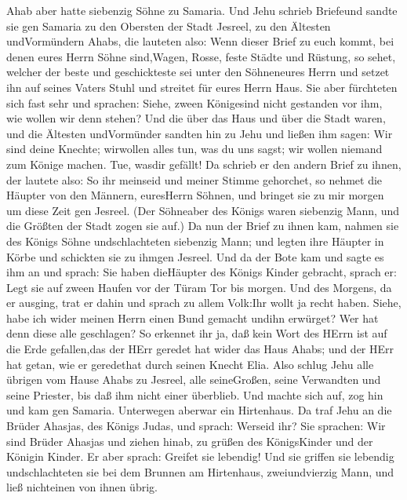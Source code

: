  Ahab aber hatte siebenzig Söhne zu Samaria. Und Jehu
schrieb Briefeund sandte sie gen Samaria zu den Obersten der Stadt
Jesreel, zu den Ältesten undVormündern Ahabs, die lauteten also:
 Wenn dieser Brief zu euch kommt, bei denen eures Herrn
Söhne sind,Wagen, Rosse, feste Städte und Rüstung,  so
sehet, welcher der beste und geschickteste sei unter den Söhneneures
Herrn und setzet ihn auf seines Vaters Stuhl und streitet für eures
Herrn Haus.  Sie aber fürchteten sich fast sehr und
sprachen: Siehe, zween Königesind nicht gestanden vor ihm, wie wollen
wir denn stehen?  Und die über das Haus und über die Stadt
waren, und die Ältesten undVormünder sandten hin zu Jehu und ließen ihm
sagen: Wir sind deine Knechte; wirwollen alles tun, was du uns sagst;
wir wollen niemand zum Könige machen. Tue, wasdir gefällt! 
Da schrieb er den andern Brief zu ihnen, der lautete also: So ihr
meinseid und meiner Stimme gehorchet, so nehmet die Häupter von den
Männern, euresHerrn Söhnen, und bringet sie zu mir morgen um diese Zeit
gen Jesreel. (Der Söhneaber des Königs waren siebenzig Mann, und die
Größten der Stadt zogen sie auf.)  Da nun der Brief zu ihnen
kam, nahmen sie des Königs Söhne undschlachteten siebenzig Mann; und
legten ihre Häupter in Körbe und schickten sie zu ihmgen Jesreel.
 Und da der Bote kam und sagte es ihm an und sprach: Sie
haben dieHäupter des Königs Kinder gebracht, sprach er: Legt sie auf
zween Haufen vor der Türam Tor bis morgen.  Und des Morgens,
da er ausging, trat er dahin und sprach zu allem Volk:Ihr wollt ja recht
haben. Siehe, habe ich wider meinen Herrn einen Bund gemacht undihn
erwürget? Wer hat denn diese alle geschlagen?  So erkennet
ihr ja, daß kein Wort des HErrn ist auf die Erde gefallen,das der HErr
geredet hat wider das Haus Ahabs; und der HErr hat getan, wie er
geredethat durch seinen Knecht Elia.  Also schlug Jehu alle
übrigen vom Hause Ahabs zu Jesreel, alle seineGroßen, seine Verwandten
und seine Priester, bis daß ihm nicht einer überblieb.  Und
machte sich auf, zog hin und kam gen Samaria. Unterwegen aberwar ein
Hirtenhaus.  Da traf Jehu an die Brüder Ahasjas, des Königs
Judas, und sprach: Werseid ihr? Sie sprachen: Wir sind Brüder Ahasjas
und ziehen hinab, zu grüßen des KönigsKinder und der Königin Kinder.
 Er aber sprach: Greifet sie lebendig! Und sie griffen sie
lebendig undschlachteten sie bei dem Brunnen am Hirtenhaus,
zweiundvierzig Mann, und ließ nichteinen von ihnen übrig. 
